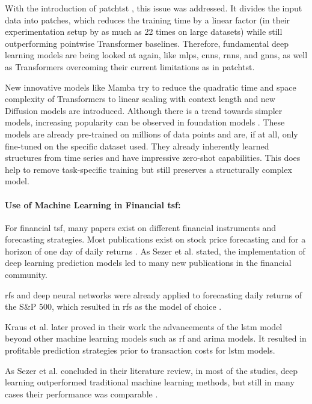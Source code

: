 \documentclass[12pt,twoside=false,a4paper,parskip]{scrbook}
\begin{document}
With the introduction of \gls{patchtst} \cite{nie2023timeseriesworth64}, this issue was addressed. It divides the input data into patches, which reduces the training time by a linear factor (in their experimentation setup by as much as 22 times on large datasets) while still outperforming pointwise Transformer baselines.
Therefore, fundamental deep learning models are being looked at again, like \glspl{mlp}, \glspl{cnn}, \glspl{rnn}, and \glspl{gnn}, as well as Transformers overcoming their current limitations as in \gls{patchtst}.

New innovative models like Mamba try to reduce the quadratic time and space complexity of Transformers to linear scaling with context length \cite{gu2024mambalineartimesequencemodeling} and new Diffusion models \cite{ho2020denoisingdiffusionprobabilisticmodels} are introduced. Although there is a trend towards simpler models, increasing popularity can be observed in foundation models \cite[p. 82]{Kim2025Survey}. These models are already pre-trained on millions of data points and are, if at all, only fine-tuned on the specific dataset used. They already inherently learned structures from time series and have impressive zero-shot capabilities. This does help to remove task-specific training but still preserves a structurally complex model.

\paragraph{Use of Machine Learning in Financial \gls{tsf}:}
For financial \gls{tsf}, many papers exist on different financial instruments and forecasting strategies. Most publications exist on stock price forecasting and for a horizon of one day of daily returns \cite[p. 18]{sezer2020financial}. As Sezer et al. \cite{sezer2020financial} stated, the implementation of deep learning prediction models led to many new publications in the financial community.

\glspl{rf} and deep neural networks were already applied to forecasting daily returns of the S\&P 500, which resulted in \glspl{rf} as the model of choice \cite{KRAUSS2017689_rf}.

Kraus et al. \cite{FISCHER2018654_lstm} later proved in their work the advancements of the \gls{lstm} model beyond other machine learning models such as \gls{rf} and \gls{arima} models. It resulted in profitable prediction strategies prior to transaction costs for \gls{lstm} models.

As Sezer et al. \cite{sezer2020financial} concluded in their literature review, in most of the studies, deep learning outperformed traditional machine learning methods, but still in many cases their performance was comparable \cite[p. 25]{sezer2020financial}.
\end{document}
